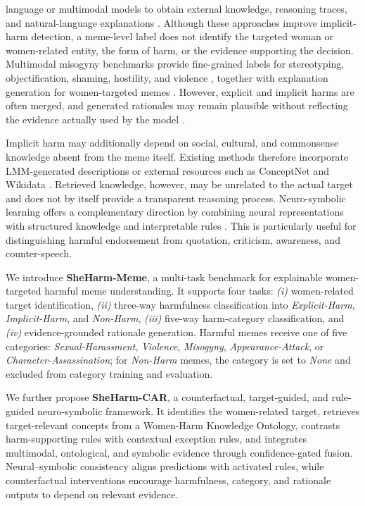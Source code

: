 \documentclass[11pt]{article}
\begin{document}
language or multimodal models to obtain external knowledge, reasoning
traces, and natural-language explanations
\citep{lin2023beneath,lin2025explainhm++,
tzelepi2024exploiting}. Although these approaches improve implicit-harm
detection, a meme-level label does not identify the targeted woman or
women-related entity, the form of harm, or the evidence supporting the
decision. Multimodal misogyny benchmarks provide fine-grained labels
for stereotyping, objectification, shaming, hostility, and violence
\citep{fersini2022semeval,muti2022unibo}, together with explanation
generation for women-targeted memes
\citep{kanwar2025beneath}. However, explicit and implicit harms are
often merged, and generated rationales may remain plausible without
reflecting the evidence actually used by the model
\citep{lin2023beneath,lin2025explainhm++}.

Implicit harm may additionally depend on social, cultural, and
commonsense knowledge absent from the meme itself. Existing methods
therefore incorporate LMM-generated descriptions or external resources
such as ConceptNet and Wikidata
\citep{tzelepi2024exploiting,tripathi2026they}. Retrieved knowledge,
however, may be unrelated to the actual target and does not by itself
provide a transparent reasoning process. Neuro-symbolic learning offers
a complementary direction by combining neural representations with
structured knowledge and interpretable rules
\citep{liu2025neural,wang2025rule}. This is particularly useful for
distinguishing harmful endorsement from quotation, criticism,
awareness, and counter-speech.

We introduce \textbf{SheHarm-Meme}, a multi-task benchmark for
explainable women-targeted harmful meme understanding. It supports four
tasks: \textit{(i)} women-related target identification,
\textit{(ii)} three-way harmfulness classification into
\textit{Explicit-Harm}, \textit{Implicit-Harm}, and
\textit{Non-Harm}, \textit{(iii)} five-way harm-category
classification, and \textit{(iv)} evidence-grounded rationale
generation. Harmful memes receive one of five categories:
\textit{Sexual-Harassment}, \textit{Violence}, \textit{Misogyny},
\textit{Appearance-Attack}, or
\textit{Character-Assassination}; for \textit{Non-Harm} memes, the
category is set to \textit{None} and excluded from category training
and evaluation.

We further propose \textbf{SheHarm-CAR}, a counterfactual,
target-guided, and rule-guided neuro-symbolic framework. It identifies
the women-related target, retrieves target-relevant concepts from a
Women-Harm Knowledge Ontology, contrasts harm-supporting rules with
contextual exception rules, and integrates multimodal, ontological,
and symbolic evidence through confidence-gated fusion.
Neural--symbolic consistency aligns predictions with activated rules,
while counterfactual interventions encourage harmfulness, category,
and rationale outputs to depend on relevant evidence.
\end{document}
